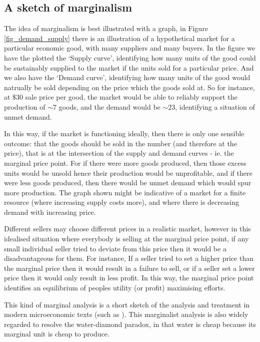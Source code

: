 \subsection{A sketch of marginalism}\label{subsec:marginal_price_sketch}

The idea of marginalism is best illustrated with a graph, in Figure \ref{fig_demand_supply} there is an illustration of a hypothetical market for a particular economic good, with many suppliers and many buyers.
In the figure we have the plotted the `Supply curve', identifying how many units of the good could be sustainably supplied to the market if the units sold for a particular price.
And we also have the `Demand curve', identifying how many units of the good would natrually be sold depending on the price which the goods sold at.
So for instance, at $\$30$ sale price per good, the market would be able to reliably support the production of $\sim 7$ goods, and the demand would be $\sim 23$, identifying a situation of unmet demand.

In this way, if the market is functioning ideally, then there is only one sensible outcome: that the goods should be sold in the number (and therefore at the price), that is at the intersection of the supply and demand curves - ie. the marginal price point.
For if there were more goods produced, then those excess units would be unsold hence their production would be unprofitable, and if there were less goods produced, then there would be unmet demand which would spur more production.
The graph shown might be indicative of a market for a finite resource (where increasing supply costs more), and where there is decreasing demand with increasing price.

Different sellers may choose different prices in a realistic market, however in this idealised situation where everybody is selling at the marginal price point, if any small individual seller tried to deviate from this price then it would be a disadvantageous for them.
For instance, If a seller tried to set a higher price than the marginal price then it would result in a failure to sell, or if a seller set a lower price then it would only result in less profit.
In this way, the marginal price point identifies an equilibrium of peoples utility (or profit) maximising efforts.

This kind of marginal analysis is a short sketch of the analysis and treatment in modern microeconomic texts (such as \cite{vohra_2020}).
This marginalist analysis is also widely regarded to resolve the water-diamond paradox, in that water is cheap because its marginal unit is cheap to produce.

